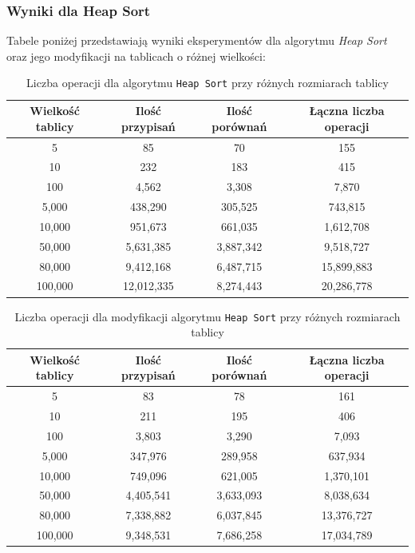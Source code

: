 \documentclass{article}
\begin{document}
\subsubsection{Wyniki dla Heap Sort}
Tabele poniżej przedstawiają wyniki eksperymentów dla algorytmu \textit{Heap Sort} oraz jego modyfikacji na tablicach o różnej wielkości:
\begin{table}[H]
    \centering
    \begin{tabular}{|c|c|c|c|}
    \hline
    \textbf{Wielkość tablicy} & \textbf{Ilość przypisań} & \textbf{Ilość porównań} & \textbf{Łączna liczba operacji} \\ \hline
    5 & 85 & 70 & 155 \\ \hline
    10 & 232 & 183 & 415 \\ \hline
    100 & 4,562 & 3,308 & 7,870 \\ \hline
    5,000 & 438,290 & 305,525 & 743,815 \\ \hline
    10,000 & 951,673 & 661,035 & 1,612,708 \\ \hline
    50,000 & 5,631,385 & 3,887,342 & 9,518,727 \\ \hline
    80,000 & 9,412,168 & 6,487,715 & 15,899,883 \\ \hline
    100,000 & 12,012,335 & 8,274,443 & 20,286,778 \\ \hline
    \end{tabular}
    \caption{Liczba operacji dla algorytmu \texttt{Heap Sort} przy różnych rozmiarach tablicy}
    \label{tab:heap_results}
\end{table}

\begin{table}[H]
    \centering
    \begin{tabular}{|c|c|c|c|}
    \hline
    \textbf{Wielkość tablicy} & \textbf{Ilość przypisań} & \textbf{Ilość porównań} & \textbf{Łączna liczba operacji} \\ \hline
    5 & 83 & 78 & 161 \\ \hline
    10 & 211 & 195 & 406 \\ \hline
    100 & 3,803 & 3,290 & 7,093 \\ \hline
    5,000 & 347,976 & 289,958 & 637,934 \\ \hline
    10,000 & 749,096 & 621,005 & 1,370,101 \\ \hline
    50,000 & 4,405,541 & 3,633,093 & 8,038,634 \\ \hline
    80,000 & 7,338,882 & 6,037,845 & 13,376,727 \\ \hline
    100,000 & 9,348,531 & 7,686,258 & 17,034,789 \\ \hline
    \end{tabular}
    \caption{Liczba operacji dla modyfikacji algorytmu \texttt{Heap Sort} przy różnych rozmiarach tablicy}
    \label{tab:m_heap_results}
\end{table}
\end{document}
